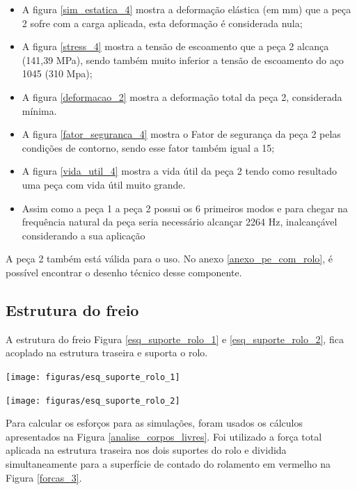    \begin{itemize}
        \item A figura \ref{sim_estatica_4} mostra a deformação elástica (em mm) que a peça 2 sofre com a carga aplicada, esta deformação é considerada nula;
        \item A figura \ref{stress_4} mostra a tensão de escoamento que a peça 2 alcança (141,39 MPa), sendo também muito inferior a tensão de escoamento do aço 1045 (310 Mpa);
        \item A figura \ref{deformacao_2} mostra a deformação total da peça 2, considerada mínima.
        \item A figura \ref{fator_seguranca_4} mostra o Fator de segurança da peça 2 pelas condições de contorno, sendo esse fator também igual a 15;
        \item A figura \ref{vida_util_4} mostra a vida útil da peça 2 tendo como resultado uma peça com vida útil muito grande.
        \item Assim como a peça 1 a peça 2 possui os 6 primeiros modos e para chegar na frequência natural da peça seria necessário alcançar 2264 Hz, inalcançável considerando a sua aplicação
    \end{itemize}

A peça 2 também está válida para o uso. No anexo \ref{anexo_pe_com_rolo}, é possível encontrar o desenho técnico desse componente.

\subsection{Estrutura do freio}

A estrutura do freio Figura \ref{esq_suporte_rolo_1} e \ref{esq_suporte_rolo_2}, fica acoplado na estrutura traseira e suporta o rolo.
 
    \begin{center}
        \texttt{[image: figuras/esq\_suporte\_rolo\_1]}
        \label{esq_suporte_rolo_1}
    \end{center} 
 
    \begin{center}
        \texttt{[image: figuras/esq\_suporte\_rolo\_2]}
        \label{esq_suporte_rolo_2}
    \end{center}
 
Para calcular os esforços para as simulações, foram usados os cálculos apresentados na Figura \ref{analise_corpos_livres}.  Foi utilizado a força total aplicada na estrutura traseira nos dois suportes do rolo e dividida simultaneamente para a superfície de contado do rolamento em vermelho na Figura \ref{forcas_3}.

